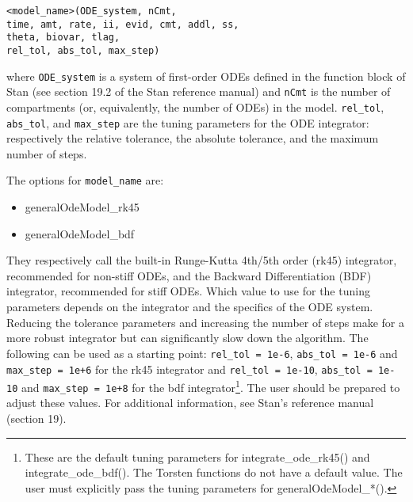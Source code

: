 \documentclass[11pt]{amsart}
\begin{document}
\texttt{<model\_name>(ODE\_system, nCmt, \\
\phantom{<model\_name>} time, amt, rate, ii, evid, cmt, addl, ss, \\
\phantom{<model\_name>} theta, biovar, tlag, \\                              
\phantom{<model\_name>} rel\_tol, abs\_tol, max\_step)}
                              
where \texttt{ODE\_system} is a system of first-order ODEs defined in the function block of Stan (see section 19.2 of the Stan reference manual) and \texttt{nCmt} is the number of compartments (or, equivalently, the number of ODEs) in the model. \texttt{rel\_tol}, \texttt{abs\_tol}, and \texttt{max\_step} are the tuning parameters for the ODE integrator: respectively the relative tolerance, the absolute tolerance, and the maximum number of steps.

The options for \texttt{model\_name} are:
\begin{itemize}
  \item generalOdeModel\_rk45
  \item generalOdeModel\_bdf
\end{itemize}

They respectively call the built-in Runge-Kutta 4th/5th order (rk45) integrator, recommended for non-stiff ODEs, and the Backward Differentiation (BDF) integrator, recommended for stiff ODEs. Which value to use for the tuning parameters depends on the integrator and the specifics of the ODE system. Reducing the tolerance parameters and increasing the number of steps make for a more robust integrator but can significantly slow down the algorithm. The following can be used as a starting point:  \mbox{\texttt{rel\_tol = 1e-6}}, \mbox{\texttt{abs\_tol = 1e-6}} and \mbox{\texttt{max\_step = 1e+6}} for the rk45 integrator and \mbox{\texttt{rel\_tol = 1e-10}}, \mbox{\texttt{abs\_tol = 1e-10}} and \mbox{\texttt{max\_step = 1e+8}} for the bdf integrator\footnote{These are the default tuning parameters for integrate\_ode\_rk45() and integrate\_ode\_bdf(). The Torsten functions do not have a default value. The user must explicitly pass the tuning parameters for generalOdeModel\_*().}. The user should be prepared to adjust these values. For additional information, see Stan's reference manual (section 19).
\end{document}
